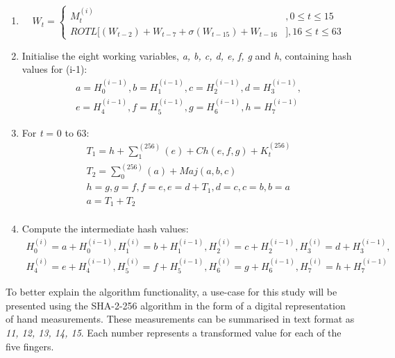     \begin{enumerate}
        
        \item \[W_t=\begin{cases}
                        M^{(i)}_t &, 0 \leq t \leq 15\\
                        ROTL[(W_{t-2}) + W_{t-7} + \sigma(W_{t-15}) + W_{t-16}  &], 16 \leq t \leq 63
                        \end{cases}\]
 
        
        \item Initialise the eight working variables, \textit{a, b, c, d, e, f, g} and \textit{h}, containing hash values for (i-1): 
            \begin{gather*}     
                a = H^{(i-1)}_0, b = H^{(i-1)}_1, c = H^{(i-1)}_2, d = H^{(i-1)}_3, \\
                e = H^{(i-1)}_4, f = H^{(i-1)}_5, g = H^{(i-1)}_6, h = H^{(i-1)}_7 
            \end{gather*}
        \item For \textit{t} = 0 to 63:
            \begin{gather*}
                T_1 = h + \sum_{1}^{(256)}(e) + Ch(e,f,g) + K^{(256)}_t \\
                T_2 = \sum_{0}^{(256)}(a) + Maj(a,b,c) \\
                h = g, g = f, f = e, e = d + T_1, d = c, c = b, b = a \\
                a = T_1 + T_2 \\
            \end{gather*}
        
        \item Compute the intermediate hash values:
            \begin{gather*}
                H^{(i)}_0 = a + H^{(i-1)}_0, H^{(i)}_1 = b + H^{(i-1)}_1, H^{(i)}_2 = c + H^{(i-1)}_2, H^{(i)}_3 = d + H^{(i-1)}_3, \\ 
                H^{(i)}_4 = e + H^{(i-1)}_4, H^{(i)}_5 = f + H^{(i-1)}_5, H^{(i)}_6 = g + H^{(i-1)}_6, H^{(i)}_7 = h + H^{(i-1)}_7
            \end{gather*}
    \end{enumerate}
    
    To better explain the algorithm functionality, a use-case for this study will be presented using the SHA-2-256 algorithm in the form of a digital representation of hand measurements. These measurements can be summarised in text format as \textit{11, 12, 13, 14, 15}. Each number represents a transformed value for each of the five fingers.
    
